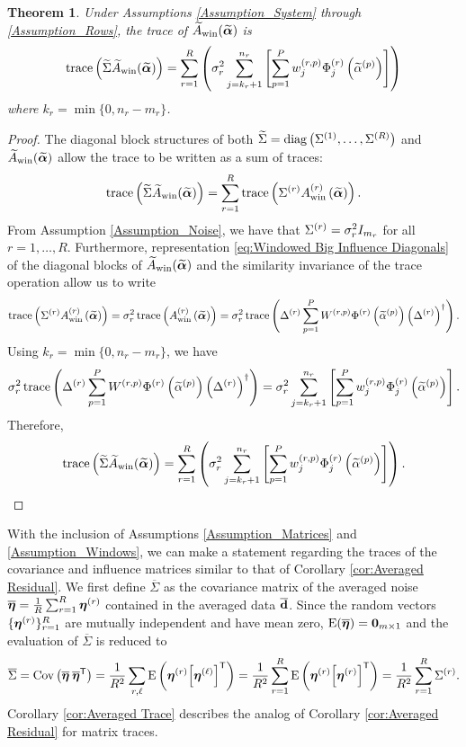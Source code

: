 \documentclass[12pt]{article}
\newtheorem{theorem}{Theorem}[section]
\begin{document}
\begin{theorem}
\label{thm:Trace}
Under Assumptions \ref{Assumption_System} through \ref{Assumption_Rows}, the trace of $\widetilde{A}_{\text{win}}(\widetilde{\bm{\alpha}})$ is
\[\operatorname{trace}\left(\widetilde{\Sigma}\widetilde{A}_{\text{win}}(\widetilde{\bm{\alpha}})\right) = \sum_{r=1}^{R} \left( \sigma_r^2 \sum_{j = k_r + 1}^{n_r} \left[\sum_{p=1}^{P} w_j^{(r,p)} \Phi_j^{(r)}\left(\widetilde{\alpha}^{(p)}\right)\right] \right)\]
where $k_r = \min\{0,n_r - m_r\}$.
\end{theorem}
\begin{proof}
The diagonal block structures of both $\widetilde{\Sigma} = \operatorname{diag}\left(\Sigma^{(1)},\ldots,\Sigma^{(R)}\right)$ and $\widetilde{A}_{\text{win}}(\widetilde{\bm{\alpha}})$ allow the trace to be written as a sum of traces:
\[\operatorname{trace}\left(\widetilde{\Sigma}\widetilde{A}_{\text{win}}(\widetilde{\bm{\alpha}})\right) = \sum_{r=1}^{R} \operatorname{trace}\left(\Sigma^{(r)}A_{\text{win}}^{(r)}\left(\widetilde{\bm{\alpha}}\right)\right).\]
From Assumption \ref{Assumption_Noise}, we have that $\Sigma^{(r)} = \sigma_r^2 I_{m_r}$ for all $r = 1,\ldots,R$. Furthermore, representation \eqref{eq:Windowed Big Influence Diagonals} of the diagonal blocks of $\widetilde{A}_{\text{win}}(\widetilde{\bm{\alpha}})$ and the similarity invariance of the trace operation allow us to write
\[\operatorname{trace}\left(\Sigma^{(r)}A_{\text{win}}^{(r)}\left(\widetilde{\bm{\alpha}}\right)\right) = \sigma_r^2 \operatorname{trace}\left(A_{\text{win}}^{(r)}\left(\widetilde{\bm{\alpha}}\right)\right) = \sigma_r^2 \operatorname{trace}\left(\Delta^{(r)}\sum_{p=1}^{P}W^{(r,p)}\Phi^{(r)}\left(\widetilde{\alpha}^{(p)}\right){\left(\Delta^{(r)}\right)}^\dagger\right).\]
Using $k_r = \min\{0,n_r - m_r\}$, we have
\[\sigma_r^2 \operatorname{trace}\left(\Delta^{(r)}\sum_{p=1}^{P}W^{(r,p)}\Phi^{(r)}\left(\widetilde{\alpha}^{(p)}\right){\left(\Delta^{(r)}\right)}^\dagger\right) = \sigma_r^2 \sum_{j = k_r + 1}^{n_r} \left[\sum_{p=1}^{P} w_j^{(r,p)} \Phi_j^{(r)}\left(\widetilde{\alpha}^{(p)}\right)\right].\]
Therefore,
\[\operatorname{trace}\left(\widetilde{\Sigma}\widetilde{A}_{\text{win}}(\widetilde{\bm{\alpha}})\right) = \sum_{r=1}^{R} \left( \sigma_r^2 \sum_{j = k_r + 1}^{n_r} \left[\sum_{p=1}^{P} w_j^{(r,p)} \Phi_j^{(r)}\left(\widetilde{\alpha}^{(p)}\right)\right] \right).\]
\end{proof}
\noindent With the inclusion of Assumptions \ref{Assumption_Matrices} and \ref{Assumption_Windows}, we can make a statement regarding the traces of the covariance and influence matrices similar to that of Corollary \ref{cor:Averaged Residual}. We first define $\overline{\Sigma}$ as the covariance matrix of the averaged noise $\overline{\bm{\eta}} = \frac{1}{R}\sum_{r=1}^R \bm{\eta}^{(r)}$ contained in the averaged data $\overline{\mathbf{d}}$. Since the random vectors $\{\bm{\eta}^{(r)}\}_{r=1}^{R}$ are mutually independent and have mean zero, $\operatorname{E}(\overline{\bm{\eta}}) = \bm{0}_{m \times 1}$ and the evaluation of $\overline{\Sigma}$ is reduced to
\begin{equation}
    \label{eq:Averaged Covariance Matrix}
    \overline{\Sigma} = \operatorname{Cov}\left(\overline{\bm{\eta}} \: {\overline{\bm{\eta}}}^\mathsf{T}\right) = \frac{1}{R^2}\sum_{r,\ell} \operatorname{E}\left(\bm{\eta}^{(r)}{\left[\bm{\eta}^{(\ell)}\right]}^\mathsf{T}\right) = \frac{1}{R^2}\sum_{r=1}^{R} \operatorname{E}\left(\bm{\eta}^{(r)}{\left[\bm{\eta}^{(r)}\right]}^\mathsf{T}\right) = \frac{1}{R^2}\sum_{r=1}^{R} \Sigma^{(r)}.
\end{equation}
Corollary \ref{cor:Averaged Trace} describes the analog of Corollary \ref{cor:Averaged Residual} for matrix traces.
\end{document}
